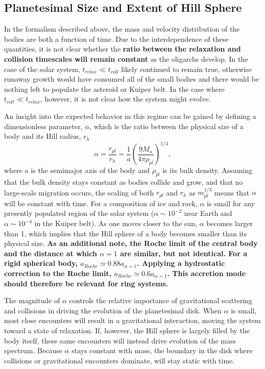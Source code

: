 \documentclass[twocolumn,linenumbers]{aastex63}
\begin{document}
\subsection{Planetesimal Size and Extent of Hill Sphere}\label{sec:sizeandhill}

In the formalism described above, the mass and velocity distribution
of the bodies are both a function of time. Due to the interdependence
of these quantities, it is not clear whether the \textbf{ratio between the relaxation and collision timescales will remain constant} as the
oligarchs develop. In the case of the solar system, $t_{relax} \ll t_{coll}$ likely continued to remain true, otherwise runaway 
growth would have consumed all of the small bodies and there would be nothing left to populate the asteroid or Kuiper belt. In 
the case where $t_{coll} \ll t_{relax}$, however, it is not clear how the system might evolve.

An insight into the expected behavior in this regime can be gained by
defining a dimensionless parameter, $\alpha$, which is the ratio
between the physical size of a body and its Hill radius, $r_{h}$
\begin{equation}\label{eq:alpha}
	\alpha = \frac{r_{pl}}{r_{h}} = \frac{1}{a} \left( \frac{9 M_{\star}}{4 \pi \rho_{pl}} \right)^{1/3},
\end{equation}
where $a$ is the semimajor axis of the body and $\rho_{pl}$ is its
bulk density. Assuming that the bulk density stays constant as bodies collide and
grow, and that no large-scale migration occurs, the scaling of both
$r_{pl}$ and $r_{h}$ as $m_{pl}^{1/3}$ means that $\alpha$ will be
constant with time. For a composition of ice and rock, $\alpha$ is
small for any presently populated region of the solar system ($\alpha \sim
10^{-2}$ near Earth and $\alpha \sim 10^{-4}$ in the Kuiper belt). As
one moves closer to the sun, $\alpha$ becomes larger than 1, which
implies that the Hill sphere of a body becomes smaller than its physical size.
\textbf{As an additional note, the Roche limit of the central body and the distance at which $\alpha = 1$ are
similar, but not identical. For a rigid spherical body, $a_{Roche} \simeq 0.88 a_{\alpha = 1}$. Applying a hydrostatic correction to the Roche limit, $a_{Roche} \simeq 0.6 a_{\alpha = 1}$. This accretion mode should
therefore be relevant for ring systems.}

The magnitude of $\alpha$ controls the relative importance of gravitational scattering and collisions in driving the evolution of the planetesimal disk. When $\alpha$ is small, most close encounters will result in a gravitational interaction, moving the system toward a state of relaxation. If, however, the Hill sphere is largely filled by the body itself, these same encounters will instead drive evolution of the mass spectrum. Because $\alpha$ stays constant with mass, the boundary in the disk where collisions or gravitational encounters dominate, will stay static with time.
\end{document}
